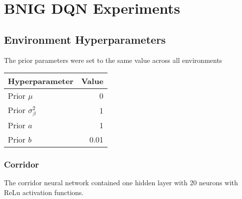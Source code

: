 {{\chapter{BNIG DQN Experiments}

\section{Environment Hyperparameters}

The prior parameters were set to the same value across all environments


\begin{table}[H]
    \centering
    \begin{tabular}{@{}lr@{}}
        \toprule
        Hyperparameter               & Value \\ \midrule
        Prior $\mu$                  & 0 \\
        Prior $\sigma_\beta^2$       & 1 \\
        Prior $a$                    & 1 \\
        Prior $b$                    & 0.01\\ \bottomrule
    \end{tabular}
\end{table}

\subsection{Corridor}

The corridor neural network contained one hidden layer with 20 neurons with ReLu activation functions.

}}
